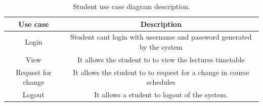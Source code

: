 \documentclass{scrreprt}
\begin{document}
\begin{table}[h!]
  \begin{center}
    \caption{Student use case diagram description.}
    \label{tab:table1}
    \begin{tabular}{|c|c|} 
\hline
      \textbf{Use case} & \textbf{Description} \\
 
      \hline
     Login& Student cant login with username and password generated by the system \\
\hline
      View& It allows the student to to view  the lectures  timetable \\
\hline
       Request for change& It allows the student to  to request for a change in course schedules\\
\hline
 
Logout&  It allows a student to logout of the system.\\
\hline
  \end{tabular}
  \end{center}
\end{table}
\end{document}

